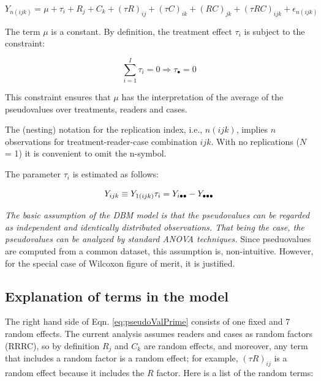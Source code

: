 \documentclass[
]{book}
\begin{document}
\begin{equation}
Y_{n(ijk)}  = \mu + \tau_i+ R_j + C_k + (\tau R)_{ij}+ (\tau C)_{ik}+ (R C)_{jk} + (\tau RC)_{ijk}+ \epsilon_{n(ijk)} 
\label{eq:DefDBMModel}
\end{equation}

The term \(\mu\) is a constant. By definition, the treatment effect \(\tau_i\) is subject to the constraint:

\begin{equation}
\sum_{i=1}^{I}\tau_i=0\Rightarrow \tau_\bullet=0
\label{eq:constraintTau}
\end{equation}

This constraint ensures that \(\mu\) has the interpretation of the average of the pseudovalues over treatments, readers and cases.

The (nesting) notation for the replication index, i.e., \(n(ijk)\), implies \(n\) observations for treatment-reader-case combination \(ijk\). With no replications (\(N\) = 1) it is convenient to omit the n-symbol.

The parameter \(\tau_i\) is estimated as follows:

\begin{equation}
Y_{ijk} \equiv Y_{1(ijk)}\\
\tau_i = Y_{i \bullet \bullet} -Y_{\bullet \bullet \bullet} 
\label{eq:estimatingTau}
\end{equation}

\emph{The basic assumption of the DBM model is that the pseudovalues can be regarded as independent and identically distributed observations. That being the case, the pseudovalues can be analyzed by standard ANOVA techniques.} Since pseduovalues are computed from a common dataset, this assumption is, non-intuitive. However, for the special case of Wilcoxon figure of merit, it is justified.

\hypertarget{explanation-of-terms-in-the-model}{%
\subsection{Explanation of terms in the model}\label{explanation-of-terms-in-the-model}}

The right hand side of Eqn. \eqref{eq:pseudoValPrime} consists of one fixed and 7 random effects. The current analysis assumes readers and cases as random factors (RRRC), so by definition \(R_j\) and \(C_k\) are random effects, and moreover, any term that includes a random factor is a random effect; for example, \((\tau R)_{ij}\) is a random effect because it includes the \(R\) factor. Here is a list of the random terms:
\end{document}
